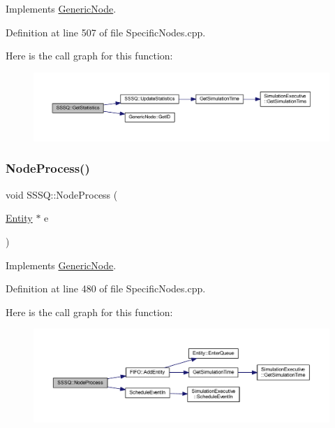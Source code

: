 Implements \hyperlink{class_generic_node_ae7c8424c8c14fd3de993c902d78deb67}{Generic\+Node}.



Definition at line 507 of file Specific\+Nodes.\+cpp.

Here is the call graph for this function\+:
\nopagebreak
\begin{figure}[H]
\begin{center}
\leavevmode
\includegraphics[width=350pt]{class_s_s_s_q_ad8f307b8a4609d28efcc122dddfe5120_cgraph}
\end{center}
\end{figure}
\mbox{\label{class_s_s_s_q_a21ff1a4817052985747b6df51bf5d643}} 
\subsubsection{\texorpdfstring{Node\+Process()}{NodeProcess()}}
{\footnotesize\ttfamily void S\+S\+S\+Q\+::\+Node\+Process (\begin{DoxyParamCaption}\item[{\hyperlink{class_entity}{Entity} $\ast$}]{e }\end{DoxyParamCaption})\hspace{0.3cm}{\ttfamily [virtual]}}



Implements \hyperlink{class_generic_node_ae942258a57f211072d179da470579add}{Generic\+Node}.



Definition at line 480 of file Specific\+Nodes.\+cpp.

Here is the call graph for this function\+:
\nopagebreak
\begin{figure}[H]
\begin{center}
\leavevmode
\includegraphics[width=350pt]{class_s_s_s_q_a21ff1a4817052985747b6df51bf5d643_cgraph}
\end{center}
\end{figure}
\mbox{\label{class_s_s_s_q_aad6abb8c7afcca47a7b567f9adfbf032}} 
